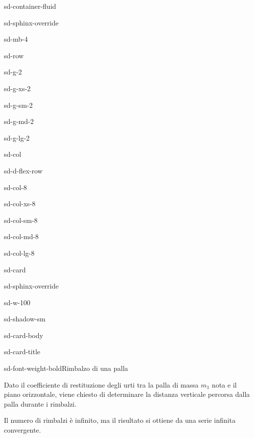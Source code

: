 \documentclass[letterpaper,10pt,italian]{jupyterBook}
\begin{document}
\begin{sphinxuseclass}{sd-container-fluid}
\begin{sphinxuseclass}{sd-sphinx-override}
\begin{sphinxuseclass}{sd-mb-4}
\begin{sphinxuseclass}{sd-row}
\begin{sphinxuseclass}{sd-g-2}
\begin{sphinxuseclass}{sd-g-xs-2}
\begin{sphinxuseclass}{sd-g-sm-2}
\begin{sphinxuseclass}{sd-g-md-2}
\begin{sphinxuseclass}{sd-g-lg-2}
\begin{sphinxuseclass}{sd-col}
\begin{sphinxuseclass}{sd-d-flex-row}
\begin{sphinxuseclass}{sd-col-8}
\begin{sphinxuseclass}{sd-col-xs-8}
\begin{sphinxuseclass}{sd-col-sm-8}
\begin{sphinxuseclass}{sd-col-md-8}
\begin{sphinxuseclass}{sd-col-lg-8}
\begin{sphinxuseclass}{sd-card}
\begin{sphinxuseclass}{sd-sphinx-override}
\begin{sphinxuseclass}{sd-w-100}
\begin{sphinxuseclass}{sd-shadow-sm}
\begin{sphinxuseclass}{sd-card-body}
\begin{sphinxuseclass}{sd-card-title}
\begin{sphinxuseclass}{sd-font-weight-bold}Rimbalzo di una palla
\end{sphinxuseclass}
\end{sphinxuseclass}
\sphinxAtStartPar
Dato il coefficiente di restituzione degli urti tra la palla di massa \(m_1\) nota e il piano orizzontale, viene chiesto di determinare la distanza verticale percorsa dalla palla durante i rimbalzi.

\sphinxAtStartPar
{} Il numero di rimbalzi è infinito, ma il risultato si ottiene da una serie infinita convergente.


\end{sphinxuseclass}
\end{sphinxuseclass}
\end{sphinxuseclass}
\end{sphinxuseclass}
\end{sphinxuseclass}
\end{sphinxuseclass}
\end{sphinxuseclass}
\end{sphinxuseclass}
\end{sphinxuseclass}
\end{sphinxuseclass}
\end{sphinxuseclass}
\end{sphinxuseclass}
\end{sphinxuseclass}
\end{sphinxuseclass}
\end{sphinxuseclass}
\end{sphinxuseclass}
\end{sphinxuseclass}
\end{sphinxuseclass}
\end{sphinxuseclass}
\end{sphinxuseclass}
\end{sphinxuseclass}
\end{document}
